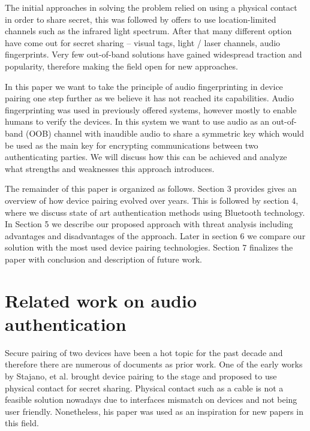 \documentclass[12pt]{article}
\begin{document}
The initial approaches in solving the problem relied on using a physical contact in order to share secret, this was followed by offers to use location-limited channels such as the infrared light spectrum. After that many different option have come out for secret sharing – visual tags, light / laser channels, audio fingerprints. Very few out-of-band solutions have gained widespread traction and popularity, therefore making the field open for new approaches.

In this paper we want to take the principle of audio fingerprinting in device pairing one step further as we believe it has not reached its capabilities. Audio fingerprinting was used in previously offered systems, however mostly to enable humans to verify the devices. In this system we want to use audio as an out-of-band (OOB) channel with inaudible audio to share a symmetric key which would be used as the main key for encrypting communications between two authenticating parties. We will discuss how this can be achieved and analyze what strengths and weaknesses this approach introduces.

The remainder of this paper is organized as follows.
Section 3 provides gives an overview of how device pairing evolved over years. This is followed by section 4, where we discuss state of art authentication methods using Bluetooth technology. In Section 5 we describe our proposed approach with threat analysis including advantages and disadvantages of the approach. Later in section 6 we compare our solution with the most used device pairing technologies. Section 7 finalizes the paper with conclusion and description of future work.

\newpage

\section{Related work on audio authentication}
\label{sec:Related work on audio authentication}

Secure pairing of two devices have been a hot topic for the past decade and therefore there are numerous of documents as prior work. One of the early works by  Stajano, et al. \cite {pairingintro} brought device pairing to the stage and proposed to use physical contact for secret sharing. Physical contact such as a cable is not a feasible solution nowadays due to interfaces mismatch on devices and not being user friendly. Nonetheless, his paper was used as an inspiration for new papers in this field.
\end{document}

